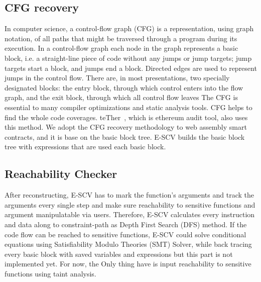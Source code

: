 \subsection{CFG recovery}
In computer science, a control-flow graph (CFG) is a representation, using graph notation, of all paths that might be traversed through a program during its execution.
In a control-flow graph each node in the graph represents a basic block, i.e. a straight-line piece of code without any jumps or jump targets; jump targets start a block, and jumps end a block. Directed edges are used to represent jumps in the control flow. There are, in most presentations, two specially designated blocks: the entry block, through which control enters into the flow graph, and the exit block, through which all control flow leaves
 The CFG is essential to many compiler optimizations and static analysis tools. CFG helps to find the whole code coverages. teTher~\cite{krupp2018teether}, which is ethereum audit tool, also uses this method. We adopt the CFG recovery methodology to web assembly smart contracts, and it is base on the basic block tree. E-SCV builds the basic block tree with expressions that are used each basic block.



\subsection{Reachability Checker}
After reconstructing, E-SCV has to mark the function's arguments and track the arguments every single step and make sure reachability to sensitive functions and argument manipulatable via users. Therefore, E-SCV calculates every instruction and data along to constraint-path as Depth First Search (DFS) method. If the code flow can be reached to sensitive functions, E-SCV could solve conditional equations using Satisfiability Modulo Theories (SMT) Solver, while back tracing every basic block with saved variables and expressions but this part is not implemented yet. For now, the Only thing have is input reachability to sensitive functions using taint analysis.


